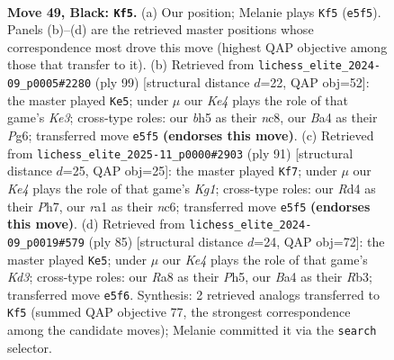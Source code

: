 \documentclass[11pt]{article}
\begin{document}
\clearpage

\begin{figure}[p]\centering
\begin{subfigure}{0.46\textwidth}\centering
\resizebox{\linewidth}{!}{%
\newchessgame
\chessboard[
  setfen={r7/4R3/pp6/4k2B/bP1r4/P6K/8/R7 b - - 1 49},
  showmover=false,
  pgfstyle=straightmove, color=movearrow, markmove={e5-f5}
]}
\caption{}
\end{subfigure}\hfill
\begin{subfigure}{0.46\textwidth}\centering
\resizebox{\linewidth}{!}{%
\newchessgame
\chessboard[
  setfen={2N5/5r1p/1R2k1p1/6P1/7P/8/1P2K1b1/8 b - - 4 50},
  showmover=false,
  pgfstyle=straightmove, color=movearrow, markmove={e6-e5}
]}
\caption{}
\end{subfigure}
\\[4pt]
\begin{subfigure}{0.46\textwidth}\centering
\resizebox{\linewidth}{!}{%
\newchessgame
\chessboard[
  setfen={R5k1/7p/2N2bp1/3P4/8/5rP1/7P/7K b - - 1 46},
  showmover=false,
  pgfstyle=straightmove, color=movearrow, markmove={g8-f7}
]}
\caption{}
\end{subfigure}\hfill
\begin{subfigure}{0.46\textwidth}\centering
\resizebox{\linewidth}{!}{%
\newchessgame
\chessboard[
  setfen={8/p1r3p1/3k4/P6p/3R4/1r5P/5PK1/8 b - - 5 43},
  showmover=false,
  pgfstyle=straightmove, color=movearrow, markmove={d6-e5}
]}
\caption{}
\end{subfigure}
\caption{\textbf{Move 49, Black: \texttt{Kf5}.} (a) Our position; Melanie plays \texttt{Kf5} (\texttt{e5f5}). Panels (b)--(d) are the retrieved master positions whose correspondence most drove this move (highest QAP objective among those that transfer to it). (b) Retrieved from \texttt{lichess\_elite\_2024-09\_p0005\#2280} (ply 99) [structural distance $d$=22, QAP obj=52]: the master played \texttt{Ke5}; under $\mu$ our \emph{Ke4} plays the role of that game's \emph{Ke3}; cross-type roles: our \emph{b}h5 as their \emph{n}c8, our \emph{B}a4 as their \emph{P}g6; transferred move \texttt{e5f5} \textbf{(endorses this move)}. (c) Retrieved from \texttt{lichess\_elite\_2025-11\_p0000\#2903} (ply 91) [structural distance $d$=25, QAP obj=25]: the master played \texttt{Kf7}; under $\mu$ our \emph{Ke4} plays the role of that game's \emph{Kg1}; cross-type roles: our \emph{R}d4 as their \emph{P}h7, our \emph{r}a1 as their \emph{n}c6; transferred move \texttt{e5f5} \textbf{(endorses this move)}. (d) Retrieved from \texttt{lichess\_elite\_2024-09\_p0019\#579} (ply 85) [structural distance $d$=24, QAP obj=72]: the master played \texttt{Ke5}; under $\mu$ our \emph{Ke4} plays the role of that game's \emph{Kd3}; cross-type roles: our \emph{R}a8 as their \emph{P}h5, our \emph{B}a4 as their \emph{R}b3; transferred move \texttt{e5f6}. Synthesis: 2 retrieved analogs transferred to \texttt{Kf5} (summed QAP objective 77, the strongest correspondence among the candidate moves); Melanie committed it via the \texttt{search} selector.}
\label{fig:thought-m97}
\end{figure}
\end{document}
